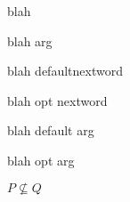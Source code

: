 \newcommand{\cmdA}{blah}
\newcommand{\cmdB}[1]{blah #1}
\newcommand{\cmdC}[1][default]{blah #1}
\newcommand{\cmdD}[2][default]{blah #1 #2}

\renewcommand{\subset}{\subseteq}



\cmdA

\cmdB{arg}

\cmdC nextword

\cmdC[opt] nextword

\cmdD{arg}

\cmdD[opt]{arg}

$P \not\subset Q$


